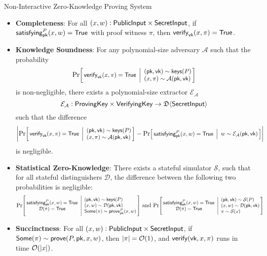 \begin{definitiontoc}{Non-Interactive Zero-Knowledge Proving System}
    \begin{itemize}
        \item \textbf{Completeness}: For all $(x, w) : {\textsf{PublicInput}} \times {\textsf{SecretInput}}$, if ${\textsf{satisfying}}^P_{\textsf{pk}}(x, w) = {\textsf{True}}$ with proof witness $\pi$, then ${\textsf{verify}}_{\textsf{vk}}(x, \pi) = {\textsf{True}}$.
        \item \textbf{Knowledge Soundness}: For any polynomial-size adversary $\mathcal{A}$ such that the probability 
        \[
            \Prob{
                \verify_\vk(x, \pi) = \True
            }{
                (\pk, \vk) \sim \keys(P) \\
                (x, \pi) \sim \mathcal{A}(\pk, \vk)
            }
        \]
            is non-negligible, there exists a polynomial-size extractor $\mathcal{E}_\mathcal{A}$
            \[\mathcal{E}_\mathcal{A} : {\textsf{ProvingKey}} \times {\textsf{VerifyingKey}} \to \mathfrak{D}\langle{{\textsf{SecretInput}}}\rangle\]
            such that the difference
            \[ \left|
                \Prob{
                \verify_\vk(x, \pi) = \True
            }{
                (\pk, \vk) \sim \keys(P) \\
                (x, \pi) \sim \mathcal{A}(\pk, \vk)
            } - \Prob{
                    \satisfying^P_\pk(x, w) = \True
                }{
                    w \sim \mathcal{E}_\mathcal{A}(\pk, \vk)
                } \right| 
            \]
            is negligible.
        \item \textbf{Statistical Zero-Knowledge}: There exists a stateful simulator $\mathcal{S}$, such that for all stateful distinguishers $\mathcal{D}$, the difference between the following two probabilities is negligible:
            \[
                \Prob{
                    \satisfying^P_\pk(x, w) = \True \\
                    \mathcal{D}(\pi) = \True
                }{
                    (\pk, \vk) \sim \keys(P) \\
                    (x, w) \sim \mathcal{D}(\pk, \vk) \\
                    \Some(\pi) \sim \prove^P_\pk(x, w)
                }
                \,\,\text{and}\,\,
                \Prob{
                    \satisfying^P_\pk(x, w) = \True \\
                    \mathcal{D}(\pi) = \True
                }{
                    (\pk, \vk) \sim \mathcal{S}(P) \\
                    (x, w) \sim \mathcal{D}(\pk, \vk) \\
                    \pi \sim \mathcal{S}(x)
                }
            \]
        \item \textbf{Succinctness}: For all $(x, w) : {\textsf{PublicInput}} \times {\textsf{SecretInput}}$, if ${\textsf{Some}}(\pi) \sim {\textsf{prove}}(P, {\textsf{pk}}, x, w)$, then $\left|\pi\right| = \mathcal{O}(1)$, and ${\textsf{verify}}({\textsf{vk}}, x, \pi)$ runs in time $\mathcal{O}(\left|x\right|)$.
    \end{itemize}
\end{definitiontoc}

